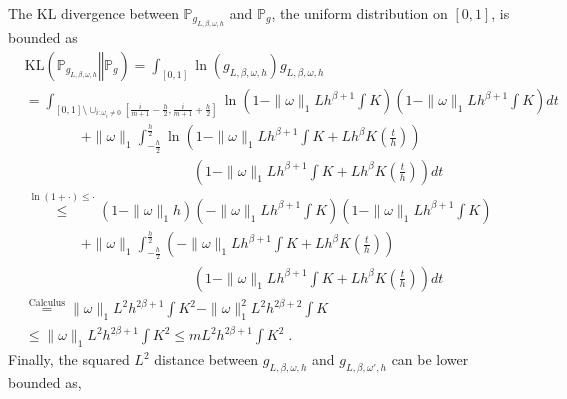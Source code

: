\documentclass[10pt]{article} %
\newcommand{\Prob}[0]{\mathbb{P}}
\newcommand\kl[2]{\mathrm{KL}\left( \left. {#1}\right\Vert {#2} \right)}
\newcommand\p[1]{\left( {#1}\right)}
\newcommand\RG[1]{\textcolor{red}{#1}}
\begin{document}
The KL divergence between $\Prob_{g_{L, \beta, \omega, h}}$ and $\Prob_{g}$, the uniform distribution on $[0, 1]$, is bounded as
\begin{equation}
    \label{eq:klkernelsaw}
    \begin{aligned}
        &\kl{\Prob_{g_{L, \beta, \omega, h}}}{\Prob_{g}}
        =
        \int_{[0, 1]} \ln \p{g_{L, \beta, \omega, h}} g_{L, \beta, \omega, h} \\
        &=
        \int_{[0, 1] \setminus \cup_{i : \omega_i \neq 0} \left[ \frac{i}{m+1} - \frac{h}{2}, \frac{i}{m+1} + \frac{h}{2} \right]} 
        \ln \p{1 - \| \omega \|_1 L h^{\beta+1} \int K} \p{1 - \| \omega \|_1 L h^{\beta+1} \int K} dt \\ 
        &\quad\quad\quad\quad+ 
        \| \omega \|_1 \int_{-\frac{h}{2}}^{\frac{h}{2}} \ln \p{1 - \| \omega \|_1 L h^{\beta+1} \int K + L h^{\beta} K \p{\frac{t}{h}}}  \\
        &\quad\quad\quad\quad\quad\quad\quad\quad\quad\quad\quad\quad
        \p{1 - \| \omega \|_1 L h^{\beta+1} \int K + L h^{\beta} K \p{\frac{t}{h}}}dt \\
        &\stackrel{\ln (1 + \cdot) \leq \cdot}{\leq }
        \p{1 - \| \omega \|_1 h}
        \p{- \| \omega \|_1 L h^{\beta+1} \int K} \p{1 - \| \omega \|_1 L h^{\beta+1} \int K}  \\ 
        &\quad\quad\quad\quad+ 
        \| \omega \|_1 \int_{-\frac{h}{2}}^{\frac{h}{2}} \p{- \| \omega \|_1 L h^{\beta+1} \int K + L h^{\beta} K \p{\frac{t}{h}}}  \\
        &\quad\quad\quad\quad\quad\quad\quad\quad\quad\quad\quad\quad
        \p{1 - \| \omega \|_1 L h^{\beta+1} \int K + L h^{\beta} K \p{\frac{t}{h}}}dt\\
        &\stackrel{\text{Calculus}}{=}
        \| \omega \|_1 L^2 h^{2\beta + 1} \int K^2 - \| \omega \|_1^2 L^2 h^{2\beta + 2} \int K \\
        &\stackrel{}{\leq}
        \| \omega \|_1 L^2 h^{2\beta + 1} \int K^2
        \leq m L^2 h^{2\beta + 1} \int K^2 \;.
    \end{aligned}
\end{equation}
Finally, the squared $L^2$ distance between $g_{L, \beta, \omega, h}$ and $g_{L, \beta, \omega', h}$ can be lower bounded as,
\end{document}
